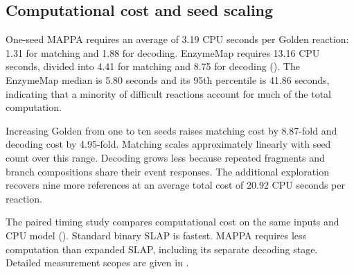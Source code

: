 \begin{table}[!htbp]
\centering\small
\caption{\textbf{Golden reference coverage across AAM methods.} All methods are evaluated over 1,851 reactions. Coverage counts reference inclusion among returned alternatives; a single prediction is a singleton set. MAPPA uses the decoded minimum-plus-five output of the full one- and ten-seed studies. Reference checks follow . Expanded SLAP includes both weight modes, both directions and the cut sweep.}
\label{tab:method-coverage}

\end{table}

\subsection{Computational cost and seed scaling}
\label{sec:paired-slap}

One-seed MAPPA requires an average of 3.19 CPU seconds per Golden reaction: 1.31 for matching and 1.88 for decoding. EnzymeMap requires 13.16 CPU seconds, divided into 4.41 for matching and 8.75 for decoding (). The EnzymeMap median is 5.80 seconds and its 95th percentile is 41.86 seconds, indicating that a minority of difficult reactions account for much of the total computation.

\begin{table}[H]
\centering\small
\caption{\textbf{Mean CPU seconds per reaction.} Matching includes fragment discovery and reduction. Both directions and the full cut sweep are included. Decoding is measured separately; publication and external verification are excluded.}
\label{tab:current-times}

\end{table}

Increasing Golden from one to ten seeds raises matching cost by 8.87-fold and decoding cost by 4.95-fold. Matching scales approximately linearly with seed count over this range. Decoding grows less because repeated fragments and branch compositions share their event responses. The additional exploration recovers nine more references at an average total cost of 20.92 CPU seconds per reaction.

The paired timing study compares computational cost on the same inputs and CPU model (). Standard binary SLAP is fastest. MAPPA requires less computation than expanded SLAP, including its separate decoding stage. Detailed measurement scopes are given in .

